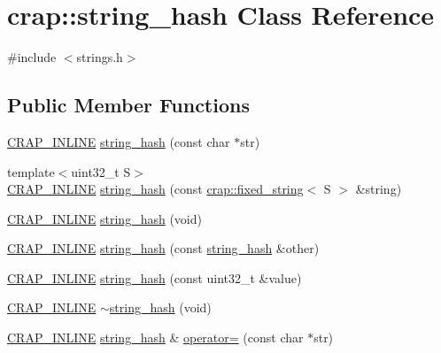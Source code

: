 \hypertarget{classcrap_1_1string__hash}{}\section{crap\+:\+:string\+\_\+hash Class Reference}
\label{classcrap_1_1string__hash}


{\ttfamily \#include $<$strings.\+h$>$}

\subsection*{Public Member Functions}
\begin{DoxyCompactItemize}
\item 
\hyperlink{config__x86_8h_a5a40526b8d842e7ff731509998bb0f1c}{C\+R\+A\+P\+\_\+\+I\+N\+L\+I\+N\+E} \hyperlink{classcrap_1_1string__hash_aef520a81411b96aa0a40c11fb1682459}{string\+\_\+hash} (const char $\ast$str)
\item 
{\footnotesize template$<$uint32\+\_\+t S$>$ }\\\hyperlink{config__x86_8h_a5a40526b8d842e7ff731509998bb0f1c}{C\+R\+A\+P\+\_\+\+I\+N\+L\+I\+N\+E} \hyperlink{classcrap_1_1string__hash_a2a2372e34d1454787515dd8c1cec0363}{string\+\_\+hash} (const \hyperlink{classcrap_1_1fixed__string}{crap\+::fixed\+\_\+string}$<$ S $>$ \&string)
\item 
\hyperlink{config__x86_8h_a5a40526b8d842e7ff731509998bb0f1c}{C\+R\+A\+P\+\_\+\+I\+N\+L\+I\+N\+E} \hyperlink{classcrap_1_1string__hash_a8d6033864011aefc4d52032cde3a30dc}{string\+\_\+hash} (void)
\item 
\hyperlink{config__x86_8h_a5a40526b8d842e7ff731509998bb0f1c}{C\+R\+A\+P\+\_\+\+I\+N\+L\+I\+N\+E} \hyperlink{classcrap_1_1string__hash_a1cfb212e35e3ac5848bf86635afb962c}{string\+\_\+hash} (const \hyperlink{classcrap_1_1string__hash}{string\+\_\+hash} \&other)
\item 
\hyperlink{config__x86_8h_a5a40526b8d842e7ff731509998bb0f1c}{C\+R\+A\+P\+\_\+\+I\+N\+L\+I\+N\+E} \hyperlink{classcrap_1_1string__hash_a66d62eda5f4c5a1115cd4f82ccd8507a}{string\+\_\+hash} (const uint32\+\_\+t \&value)
\item 
\hyperlink{config__x86_8h_a5a40526b8d842e7ff731509998bb0f1c}{C\+R\+A\+P\+\_\+\+I\+N\+L\+I\+N\+E} \hyperlink{classcrap_1_1string__hash_aa7190b01ffa4d9e8cdb88c4f396f014d}{$\sim$string\+\_\+hash} (void)
\item 
\hyperlink{config__x86_8h_a5a40526b8d842e7ff731509998bb0f1c}{C\+R\+A\+P\+\_\+\+I\+N\+L\+I\+N\+E} \hyperlink{classcrap_1_1string__hash}{string\+\_\+hash} \& \hyperlink{classcrap_1_1string__hash_a6c707eb4e241e03bfdf48641c565bfb7}{operator=} (const char $\ast$str)

\end{DoxyCompactItemize}
